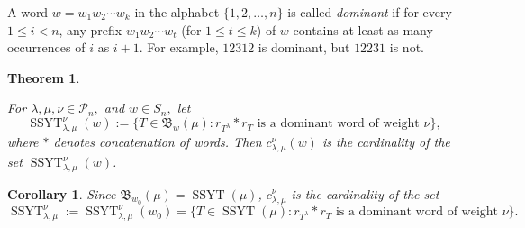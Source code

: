 \documentclass[11pt,reqno]{amsart}
\newcommand\Par{\mathscr{P}}
\newtheorem{theorem}{Theorem}
\newtheorem{corollary}{Corollary}
\DeclareMathOperator{\SSYT}{SSYT}
\begin{document}
A word $w = w_1w_2\cdots w_k$ in the alphabet $\{1,2,\dots,n\}$ is called {\em dominant} if for every $1 \leq i <n$, any prefix $ w_1w_2\cdots w_t$ (for $1 \leq t \leq k$) of $w$ contains at least as many occurrences of $i$ as $i+1$. For example, $12312$ is dominant, but $12231$ is not.
\begin{theorem}
\begin{upshape}
    \cite[Theorem 5.25]{Joseph} \cite[Theorem 4.1]{Mrigendra:saturation}
\end{upshape}
\label{thm:joseph}
For $\lambda,\mu,\nu \in \Par_n,$ and $w \in S_n,$ let
\[ \SSYT_{\lambda,\mu}^{\nu}(w) :=\{T \in \mathfrak{B}_w(\mu): r_{T^{\lambda}}*r_T \text{ is a dominant word of weight } \nu\},\] where $*$ denotes concatenation of words. Then $c^{\nu}_{\lambda,\mu}(w)$ is the cardinality of the set $\SSYT_{\lambda,\mu}^{\nu}(w)$.
\end{theorem}
\begin{corollary}
\label{cor:LR-rule}
Since $\mathfrak{B}_{w_0}(\mu) = \SSYT(\mu)$, $c^{\nu}_{\lambda,\mu}$ is the cardinality of the set \[ \SSYT_{\lambda,\mu}^{\nu}:= \SSYT_{\lambda,\mu}^{\nu}(w_0) =\{T \in \SSYT(\mu): r_{T^{\lambda}}*r_T \text{ is a dominant word of weight } \nu\}.\]
\end{corollary}
\end{document}
